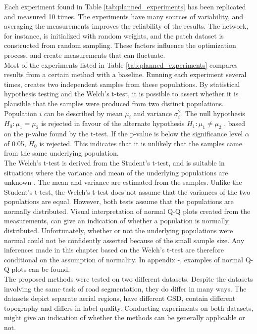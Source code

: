 Each experiment found in Table \ref{tab:planned_experiments} has been replicated and measured 10 times. The experiments have many sources of variability, and averaging the measurements improves the reliability of the results. The network, for instance, is initialized with random weights, and the patch dataset is constructed from random sampling. These factors influence the optimization process, and create measurements that can fluctuate.\\

Most of the experiments listed in Table \ref{tab:planned_experiments} compares results from a certain method with a baseline. Running each experiment several times, creates two independent samples from these populations. By statistical hypothesis testing and the Welch's t-test, it is possible to assert whether it is plausible that the samples were produced from two distinct populations. Population $i$ can be described by mean $\mu_i$ and variance $\sigma^2_i$. The null hypothesis $H_0\colon \mu_1 = \mu_2$ is rejected in favour of the alternate hypothesis $H_1\colon\mu_1 \neq \mu_2$ , based on the p-value found by the t-test.  If the p-value is below the significance level $\alpha$ of 0.05, $H_0$ is rejected. This indicates that it is unlikely that the samples came from the same underlying population.\\

The Welch's t-test is derived from the Student's t-test, and is suitable in situations where the variance and mean of the underlying populations are unknown \citep{walpole_probability}. The mean and variance are estimated from the samples. Unlike the Student's t-test, the Welch's t-test does not assume that the variances of the two populations are equal. However, both tests assume that the populations are normally distributed. Visual interpretation of normal Q-Q plots created from the measurements, can give an indication of whether a population is normally distributed. Unfortunately, whether or not the underlying populations were normal could not be confidently asserted because of the small sample size. Any inferences made in this chapter based on the Welch's t-test are therefore conditional on the assumption of normality. In appendix -, examples of normal Q-Q plots can be found.\\ 
 
The proposed methods were tested on two different datasets. Despite the datasets involving the same task of road segmentation, they do differ in many ways. The datasets depict separate aerial regions, have different \ac{GSD}, contain different topography and differs in label quality. Conducting experiments on both datasets, might give an indication of whether the methods can be generally applicable or not.\\

